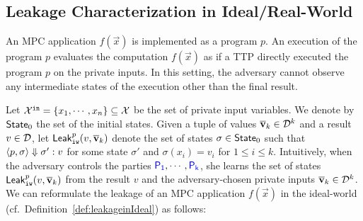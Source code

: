 
\subsection{Leakage Characterization in Ideal/Real-World}
An MPC application $f(\vec{x})$ is implemented as a {\LANG} program $p$.
An execution of the program $p$ evaluates the computation $f(\vec{x})$
as if a TTP directly executed the program $p$ on the private inputs.
In this setting, the adversary cannot observe any intermediate states of the execution %
other than the final result. %

Let $\mathcal{X}^{\tt in}=\{x_1,\cdots,x_n\}\subseteq\mathcal{X}$ be the set of private input variables.
We denote by ${\sf State}_0$ %
the set of the initial states.
Given a tuple of values $\overline{\bf{v}}_k\in\mathcal{D}^k$  %
and a result $v\in \mathcal{D}$, let ${\sf Leak}_{\tt iw}^p(v,\overline{\bf{v}}_k)$ %
denote the set of states $\sigma\in {\sf State}_0$ such that
$\langle{p, \sigma}\rangle\Downarrow \sigma':v$ for some state $\sigma'$ and $\sigma(x_i)=v_i$ for $1\leq i\leq k$.
Intuitively, when the adversary controls the parties ${\textcolor{blue}{\sf P_{1}}},\cdots, {\textcolor{blue}{\sf P_{k}}}$,
she learns the set of states ${\sf Leak}_{\tt iw}^p(v,\overline{\bf{v}}_k)$
from the result $v$ and the adversary-chosen private inputs $\overline{\bf{v}}_k\in\mathcal{D}^k$.
%
We can reformulate the leakage of an MPC application $f(\vec{x})$ in the ideal-world (cf.\ Definition~\ref{def:leakageinIdeal})
as follows:


